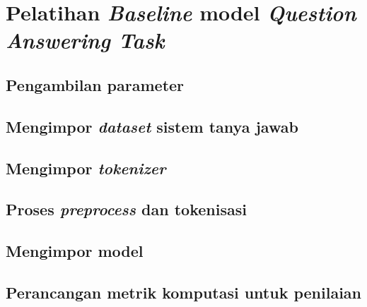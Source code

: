 \section{Pelatihan \emph{Baseline} model \emph{Question Answering Task}}

\subsection{Pengambilan parameter}

\subsection{Mengimpor \emph{dataset} sistem tanya jawab}

\subsection{Mengimpor \emph{tokenizer}}

\subsection{Proses \emph{preprocess} dan tokenisasi}

\subsection{Mengimpor model}

\subsection{Perancangan metrik komputasi untuk penilaian}

